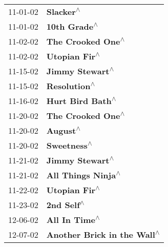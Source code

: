 \begin{supertabular}{p{0.25\columnwidth}p{0.75\columnwidth}}
 11-01-02 &                                                                  \textbf{Slacker\textsuperscript{$\wedge$}} \\
 11-01-02 &                                                               \textbf{10th Grade\textsuperscript{$\wedge$}} \\
 11-02-02 &                                                          \textbf{The Crooked One\textsuperscript{$\wedge$}} \\
 11-02-02 &                                                              \textbf{Utopian Fir\textsuperscript{$\wedge$}} \\
 11-15-02 &                                                            \textbf{Jimmy Stewart\textsuperscript{$\wedge$}} \\
 11-15-02 &                                                               \textbf{Resolution\textsuperscript{$\wedge$}} \\
 11-16-02 &                                                           \textbf{Hurt Bird Bath\textsuperscript{$\wedge$}} \\
 11-20-02 &                                                          \textbf{The Crooked One\textsuperscript{$\wedge$}} \\
 11-20-02 &                                                                   \textbf{August\textsuperscript{$\wedge$}} \\
 11-20-02 &                                                                \textbf{Sweetness\textsuperscript{$\wedge$}} \\
 11-21-02 &                                                            \textbf{Jimmy Stewart\textsuperscript{$\wedge$}} \\
 11-21-02 &                                                         \textbf{All Things Ninja\textsuperscript{$\wedge$}} \\
 11-22-02 &                                                              \textbf{Utopian Fir\textsuperscript{$\wedge$}} \\
 11-23-02 &                                                                 \textbf{2nd Self\textsuperscript{$\wedge$}} \\
 12-06-02 &                                                              \textbf{All In Time\textsuperscript{$\wedge$}} \\
 12-07-02 &                                                \textbf{Another Brick in the Wall\textsuperscript{$\wedge$}} \\

\end{supertabular}
